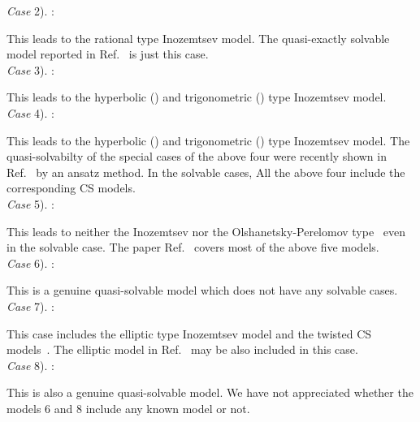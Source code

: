 \documentclass[a4paper,preprint,amsfonts,amssymb,amsmath,%
tightenlines,nofootinbib,noshowpacs]{revtex4}
\providecommand{\rnu}{\sqrt{\nu}}
\begin{document}
\noindent
\textit{Case} 2). \coordHE{}:

This leads to the rational \coordHE{} type Inozemtsev model.
The quasi-exactly solvable model reported in Ref.~\cite{HoSh1} is
just this case.\\

\noindent
\textit{Case} 3). \myHighlight{$h(q)=e^{2\rnu q}$}\coordHE{}:

This leads to the hyperbolic (\coordHE{}) and
trigonometric (\coordHE{}) \coordHE{} type Inozemtsev model.\\

\noindent
\textit{Case} 4). \myHighlight{$h(q)=\cosh 2\rnu q$}\coordHE{}:

This leads to the hyperbolic (\coordHE{}) and
trigonometric (\coordHE{}) \coordHE{} type Inozemtsev model.
The quasi-solvabilty of the special cases of the above four
were recently shown in Ref.~\cite{SaTa1} by an ansatz method.
In the solvable cases, All the above four include the corresponding
CS models.\\

\noindent
\textit{Case} 5). \myHighlight{$h(q)=\sinh 2\rnu q$}\coordHE{}:

This leads to neither the Inozemtsev nor the Olshanetsky-Perelomov
type~\cite{OlPe2} even in the solvable case.
The paper Ref.~\cite{UlLoRo1} covers most of the above five models.\\

\noindent
\textit{Case} 6). \myHighlight{$h(q)=\tan\rnu q$}\coordHE{}:

This is a genuine quasi-solvable model which does not have
any solvable cases.\\

\noindent
\textit{Case} 7). \coordHE{}:

This case includes the elliptic \coordHE{} type Inozemtsev model and the
twisted CS models~\cite{HoPh1,HoPh2,BoSa1}. The elliptic model in
Ref.~\cite{UlLoRo2} may be also included in this case.\\

\noindent
\textit{Case} 8). \myHighlight{$h(q)=\text{sn }(\nu q|k)/\,\text{cn }(\rnu q|k)$}\coordHE{}:

This is also a genuine quasi-solvable model. We have not appreciated
whether the models 6 and 8 include any known model or not.
\\
\end{document}
